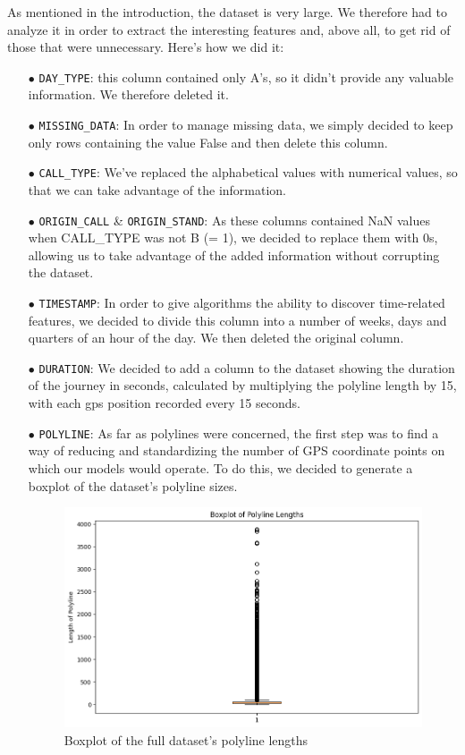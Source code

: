 \documentclass[12pt, titlepage]{article}
\begin{document}
As mentioned in the introduction, the dataset is very large. We therefore had to analyze it in order to extract the interesting features and, above all, to get rid of those that were unnecessary. Here's how we did it:
\begin{itemize}
    \item[$\bullet$] \texttt{DAY\_TYPE}: this column contained only A's, so it didn't provide any valuable information. We therefore deleted it.
    \item[$\bullet$] \texttt{MISSING\_DATA}: In order to manage missing data, we simply decided to keep only rows containing the value False and then delete this column.
    \item[$\bullet$] \texttt{CALL\_TYPE}: We've replaced the alphabetical values with numerical values, so that we can take advantage of the information.
    \item[$\bullet$] \texttt{ORIGIN\_CALL} \& \texttt{ORIGIN\_STAND}: As these columns contained NaN values when CALL\_TYPE was not B (= 1), we decided to replace them with 0s, allowing us to take advantage of the added information without corrupting the dataset.
    \item[$\bullet$] \texttt{TIMESTAMP}: In order to give algorithms the ability to discover time-related features, we decided to divide this column into a number of weeks, days and quarters of an hour of the day. We then deleted the original column.
    \item[$\bullet$] \texttt{DURATION}: We decided to add a column to the dataset showing the duration of the journey in seconds, calculated by multiplying the polyline length by 15, with each gps position recorded every 15 seconds.
    \item[$\bullet$] \texttt{POLYLINE}: As far as polylines were concerned, the first step was to find a way of reducing and standardizing the number of GPS coordinate points on which our models would operate. To do this, we decided to generate a boxplot of the dataset's polyline sizes. 
    
    \begin{figure}[H]
        \centering
        \includegraphics[scale = 0.5]{image/boxplot-length-full.png}
        \caption{Boxplot of the full dataset’s polyline lengths}
        \label{fig:menu}
    \end{figure}
    

\end{itemize}
\end{document}
